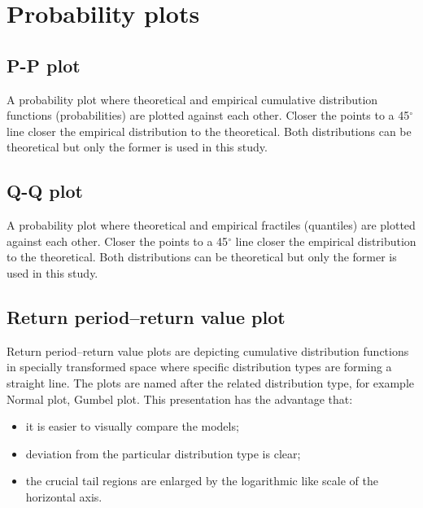 

\section{Probability plots}
\label{sec:prob_plots}

\subsection*{P-P plot}

A probability plot where theoretical and empirical cumulative distribution functions (probabilities) are plotted against each other. Closer the points to a 45$^\circ$ line closer the empirical distribution to the theoretical. Both distributions can be theoretical but only the former is used in this study.

\subsection*{Q-Q plot}

A probability plot where theoretical and empirical fractiles (quantiles) are plotted against each other. Closer the points to a 45$^\circ$ line closer the empirical distribution to the theoretical. Both distributions can be theoretical but only the former is used in this study.

\subsection*{Return period--return value plot}

Return period--return value plots are depicting cumulative distribution functions in specially transformed space where specific distribution types are forming a straight line. The plots are named after the related distribution type, for example Normal plot, Gumbel plot.
This  presentation  has  the  advantage  that:
\begin{itemize}
	\item it is easier  to  visually compare the models;
	\item deviation from the particular distribution type is clear;
	\item the crucial tail regions are enlarged by the logarithmic like scale of the horizontal axis.
\end{itemize}

